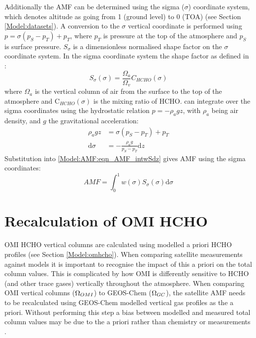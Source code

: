   Additionally the AMF can be determined using the sigma ($\sigma$) coordinate system, which denotes altitude as going from 1 (ground level) to 0 (TOA) (see Section \ref{Model:datasets}).
  A conversion to the $\sigma$ vertical coordinate is performed using $p = \sigma (p_S - p_T) + p_T$, where $p_T$ is pressure at the top of the atmosphere and $p_S$ is surface pressure. 
  $S_\sigma$ is a dimensionless normalised shape factor on the $\sigma$ coordinate system.
  In the sigma coordinate system the shape factor as defined in \textcite{Palmer2001} :
  \begin{equation}
    \label{Model:AMF:eqn_ShapeFactorSigma}
    S_\sigma(\sigma) = \frac{\Omega_a}{\Omega_v}C_{HCHO}(\sigma)
  \end{equation}
  where $\Omega_a$ is the vertical column of air from the surface to the top of the atmosphere and C$_{HCHO}(\sigma)$ is the mixing ratio of HCHO.
   can integrate over the sigma coordinates using the hydrostatic relation $p = - \rho_a g z$, with $\rho_a$ being air density, and $g$ the gravitational acceleration:
  \begin{align*}
    \rho_a g z & = \sigma \left( p_S - p_T \right) + p_T \\
    \mathrm{d}\sigma  & = - \frac{ \rho_a g }{ p_S - p_T } \mathrm{d}z
  \end{align*}
  Substitution into \ref{Model:AMF:eqn_AMF_intwSdz} gives AMF using the sigma coordinates:
  \begin{equation} \label{Model:AMF:eqn_AMFintwSdsigma}
    AMF = \int_0^1 w(\sigma) S_\sigma(\sigma) \mathrm{d}\sigma
  \end{equation}

\section{Recalculation of OMI HCHO}
  \label{Model:omiRecalc}
  
  
  OMI HCHO vertical columns are calculated using modelled a priori HCHO profiles (see Section \ref{Model:omhcho}).
  When comparing satellite measurements against models it is important to recognise the impact of this a priori on the total column values.
  This is complicated by how OMI is differently sensitive to HCHO (and other trace gases) vertically throughout the atmosphere.
  When comparing OMI vertical columns ($\Omega_{OMI}$) to GEOS-Chem ($\Omega_{GC}$), the satellite AMF needs to be recalculated using GEOS-Chem modelled vertical gas profiles as the a priori.
  Without performing this step a bias between modelled and measured total column values may be due to the a priori rather than chemistry or measurements \parencite{Palmer2001, Lamsal2014}.
  
